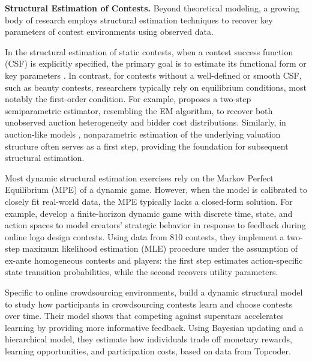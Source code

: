 \documentclass[mnsc]{informs3}
\begin{document}
\textbf{Structural Estimation of Contests.}
Beyond theoretical modeling, a growing body of research employs structural estimation techniques to recover key parameters of contest environments using observed data.

In the structural estimation of static contests, when a contest success function (CSF) is explicitly specified, the primary goal is to estimate its functional form or key parameters \citep{hwang2012technology, kang2016policy, huang2021structural}.
In contrast, for contests without a well-defined or smooth CSF, such as beauty contests, researchers typically rely on equilibrium conditions, most notably the first-order condition.
For example, \citet{yoganarasimhan2016estimation} proposes a two-step semiparametric estimator, resembling the EM algorithm, to recover both unobserved auction heterogeneity and bidder cost distributions.
Similarly, in auction-like models \citep{guerre2000optimal, shakhgildyan2022nonparametric}, nonparametric estimation of the underlying valuation structure often serves as a first step, providing the foundation for subsequent structural estimation.

Most dynamic structural estimation exercises rely on the Markov Perfect Equilibrium (MPE) of a dynamic game.
However, when the model is calibrated to closely fit real-world data, the MPE typically lacks a closed-form solution.
For example, \citet{jiang2022feedback} develop a finite-horizon dynamic game with discrete time, state, and action spaces to model creators’ strategic behavior in response to feedback during online logo design contests.
Using data from 810 contests, they implement a two-step maximum likelihood estimation (MLE) procedure under the assumption of ex-ante homogeneous contests and players: the first step estimates action-specific state transition probabilities, while the second recovers utility parameters.

Specific to online crowdsourcing environments,
\citet{zhang2019structural} build a dynamic structural model to study how participants in crowdsourcing contests learn and choose contests over time.
Their model shows that competing against superstars accelerates learning by providing more informative feedback.
Using Bayesian updating and a hierarchical model, they estimate how individuals trade off monetary rewards, learning opportunities, and participation costs, based on data from Topcoder.
\end{document}
